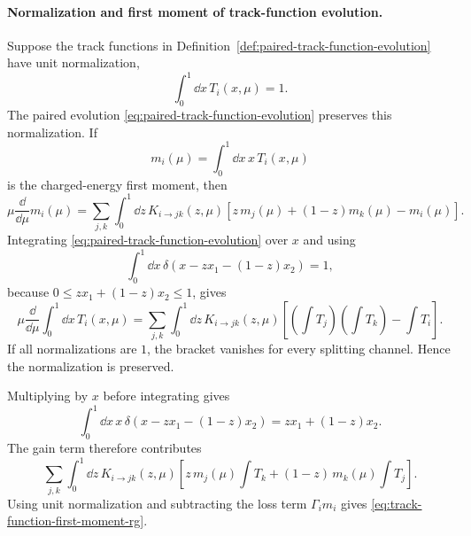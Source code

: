 \paragraph{Normalization and first moment of track-function evolution.}
Suppose the track functions in
Definition~\ref{def:paired-track-function-evolution} have unit normalization,
\[
  \int_0^1\dd x\,T_i(x,\mu)=1 .
\]
The paired evolution
\eqref{eq:paired-track-function-evolution} preserves this normalization.
If
\[
  m_i(\mu)=\int_0^1\dd x\,x\,T_i(x,\mu)
\]
is the charged-energy first moment, then
\begin{equation}
  \mu\frac{\dd}{\dd\mu}m_i(\mu)
  =
  \sum_{j,k}\int_0^1\dd z\,K_{i\to jk}(z,\mu)
  \left[z\,m_j(\mu)+(1-z)m_k(\mu)-m_i(\mu)\right].
  \label{eq:track-function-first-moment-rg}
\end{equation}
Integrating \eqref{eq:paired-track-function-evolution} over \(x\) and using
\[
  \int_0^1\dd x\,
  \delta\!\left(x-zx_1-(1-z)x_2\right)
  =
  1,
\]
because \(0\leq zx_1+(1-z)x_2\leq1\), gives
\[
  \mu\frac{\dd}{\dd\mu}\int_0^1\dd x\,T_i(x,\mu)
  =
  \sum_{j,k}\int_0^1\dd z\,K_{i\to jk}(z,\mu)
  \left[
    \left(\int T_j\right)\left(\int T_k\right)
    -\int T_i
  \right].
\]
If all normalizations are \(1\), the bracket vanishes for every splitting
channel.  Hence the normalization is preserved.

Multiplying by \(x\) before integrating gives
\[
  \int_0^1\dd x\,x\,
  \delta\!\left(x-zx_1-(1-z)x_2\right)
  =
  zx_1+(1-z)x_2.
\]
The gain term therefore contributes
\[
  \sum_{j,k}\int_0^1\dd z\,K_{i\to jk}(z,\mu)
  \left[
    z\,m_j(\mu)\int T_k
    +(1-z)\,m_k(\mu)\int T_j
  \right].
\]
Using unit normalization and subtracting the loss term
\(\Gamma_i m_i\) gives \eqref{eq:track-function-first-moment-rg}.

